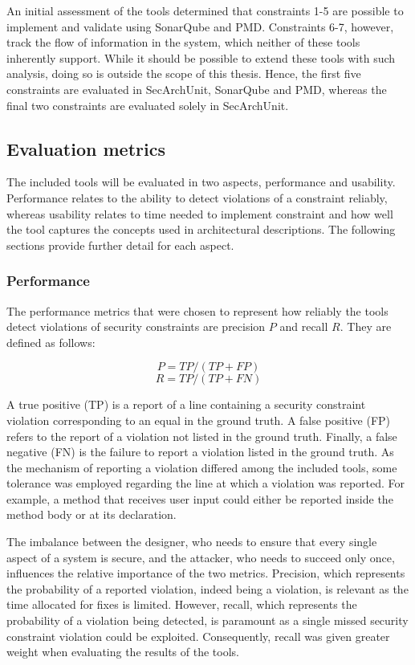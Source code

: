 An initial assessment of the tools determined that constraints 1-5 are possible to implement and validate using SonarQube and PMD. Constraints 6-7, however, track the flow of information in the system, which neither of these tools inherently support. While it should be possible to extend these tools with such analysis, doing so is outside the scope of this thesis.
Hence, the first five constraints are evaluated in SecArchUnit, SonarQube and PMD, whereas the final two constraints are evaluated solely in SecArchUnit.



\subsection{Evaluation metrics}
The included tools will be evaluated in two aspects, performance and usability. Performance relates to the ability to detect violations of a constraint reliably, whereas usability relates to time needed to implement constraint and how well the tool captures the concepts used in architectural descriptions. The following sections provide further detail for each aspect.

\subsubsection{Performance}
The performance metrics that were chosen to represent how reliably the tools detect violations of security constraints are precision $P$ and recall $R$. They are defined as follows:

\[ P = TP / (TP + FP) \]
\[ R = TP / (TP + FN) \]

A true positive (TP) is a report of a line containing a security constraint violation corresponding to an equal in the ground truth. A false positive (FP) refers to the report of a violation not listed in the ground truth. Finally, a false negative (FN) is the failure to report a violation listed in the ground truth. As the mechanism of reporting a violation differed among the included tools, some tolerance was employed regarding the line at which a violation was reported. For example, a method that receives user input could either be reported inside the method body or at its declaration.

The imbalance between the designer, who needs to ensure that every single aspect of a system is secure, and the attacker, who needs to succeed only once, influences the relative importance of the two metrics. Precision, which represents the probability of a reported violation, indeed being a violation, is relevant as the time allocated for fixes is limited. However, recall, which represents the probability of a violation being detected, is paramount as a single missed security constraint violation could be exploited. Consequently, recall was given greater weight when evaluating the results of the tools.

